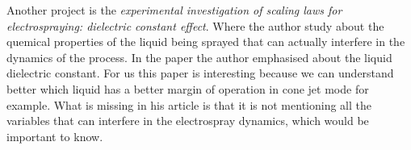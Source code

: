 \documentclass[10pt]{article}
\begin{document}
Another project is the \emph{experimental investigation of scaling laws for electrospraying: dielectric constant effect}\cite*[]{Chen_Pui}.
Where the author study about the quemical properties of the liquid being sprayed that can actually interfere in the dynamics of the process. 
In the paper the author emphasised about the liquid dielectric constant. For us this paper is interesting because we can understand better which liquid
has a better margin of operation in cone jet mode for example. What is missing in his article is that it is not mentioning all the variables that can interfere in the 
electrospray dynamics, which would be important to know.



\pagebreak
\printbibliography
\end{document}
